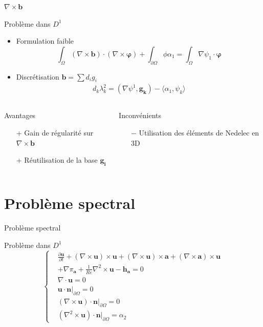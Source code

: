 \documentclass{beamer}
\newcommand{\grad}{{\nabla}}
\newcommand{\rot}{{\nabla\times}}
\newcommand{\rott}{{\nabla^2\times}}
\renewcommand{\div}{{\nabla\cdot}}
\newcommand{\restr}{{\big\rvert_{\partial\Omega}}}
\begin{document}
\begin{frame}{$\rot \mathbf{b}$}
\begin{block}{Problème dans $ D^1$}
\begin{itemize}
\item Formulation faible
\[
\int_\Omega (\rot\mathbf{b})\cdot(\rot\bm{\varphi}) + \int_{\partial\Omega} \phi\alpha_1 = \int_\Omega \grad\psi_1\cdot\bm{\varphi}
\]
\item Discrétisation $\mathbf{b}=\sum d_ig_i$
\begin{align*}
d_k\lambda_k^2 = (\grad\psi^1,\mathbf{g_k}) - \langle\alpha_1,\psi_k\rangle
\end{align*}
\end{itemize}
\end{block}
\begin{columns}[t]
\begin{column}{5cm}
\begin{exampleblock}{Avantages}
\begin{itemize}
\item[+] Gain de régularité sur $\rot \mathbf{b}$
\item[+] Réutilisation de la base $\mathbf{g_i}$ 
\end{itemize}
\end{exampleblock}
\end{column}
\begin{column}{5cm}
\begin{alertblock}{Inconvénients}
\begin{itemize}
\item[$-$] Utilisation des éléments de Nedelec en 3D
\end{itemize}
\end{alertblock}
\end{column}
\end{columns}
\end{frame}

\section{Problème spectral}
\begin{frame}{Problème spectral}
\begin{block}{Problème dans $ D^1$}
\[
\left\{
\begin{aligned}
&\frac{\partial \mathbf{u}}{\partial t} + (\rot \mathbf{u})\times \mathbf{u} + (\rot \mathbf{u})\times \mathbf{a} + \left(\rot \mathbf{a}\right)\times \mathbf{u} \\
&+ \grad\pi_\mathbf{a} + \frac{1}{Re}\rott \mathbf{u} - \mathbf{h_a} = 0\\
&\div \mathbf{u} = 0\\
&\mathbf{u}\cdot \mathbf{n}\restr = 0\\
&(\rot \mathbf{u})\cdot \mathbf{n}\restr = 0\\
&(\rott \mathbf{u})\cdot \mathbf{n}\restr = \alpha_2
\end{aligned}
\right.
\]
\end{block}
\end{frame}
\end{document}
